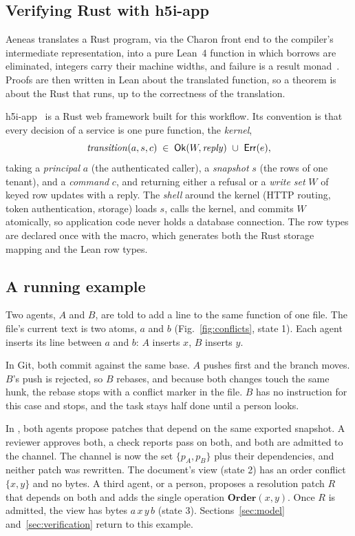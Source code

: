 \subsection{Verifying Rust with h5i-app}
Aeneas translates a Rust program, via the Charon front end to the compiler's intermediate representation, into a pure Lean~4 function in which borrows are eliminated, integers carry their machine widths, and failure is a result monad~\cite{charon,aeneas}. Proofs are then written in Lean about the translated function, so a theorem is about the Rust that runs, up to the correctness of the translation.

h5i-app~\cite{h5i} is a Rust web framework built for this workflow. Its convention is that every decision of a service is one pure function, the \emph{kernel},
\begin{equation}
 \mathit{transition}(a,s,c)\;\in\;\Ok(W,\mathit{reply})\ \cup\ \Err(e),
 \label{eq:kernel}
\end{equation}
taking a \emph{principal} $a$ (the authenticated caller), a \emph{snapshot} $s$ (the rows of one tenant), and a \emph{command} $c$, and returning either a refusal or a \emph{write set} $W$ of keyed row updates with a reply. The \emph{shell} around the kernel (HTTP routing, token authentication, storage) loads $s$, calls the kernel, and commits $W$ atomically, so application code never holds a database connection. The row types are declared once with the  macro, which generates both the Rust storage mapping and the Lean row types.

\subsection{A running example}\label{sec:example}
Two agents, $A$ and $B$, are told to add a line to the same function of one file. The file's current text is two atoms, $a$ and $b$ (Fig.~\ref{fig:conflicts}, state 1). Each agent inserts its line between $a$ and $b$: $A$ inserts $x$, $B$ inserts $y$.

In Git, both commit against the same base. $A$ pushes first and the branch moves. $B$'s push is rejected, so $B$ rebases, and because both changes touch the same hunk, the rebase stops with a conflict marker in the file. $B$ has no instruction for this case and stops, and the task stays half done until a person looks.

In \sys, both agents propose patches that depend on the same exported snapshot. A reviewer approves both, a check reports pass on both, and both are admitted to the channel. The channel is now the set $\{p_A,p_B\}$ plus their dependencies, and neither patch was rewritten. The document's view (state 2) has an order conflict $\{x,y\}$ and no bytes. A third agent, or a person, proposes a resolution patch $R$ that depends on both and adds the single operation $\mathbf{Order}(x,y)$. Once $R$ is admitted, the view has bytes $a\,x\,y\,b$ (state 3). Sections~\ref{sec:model} and~\ref{sec:verification} return to this example.

